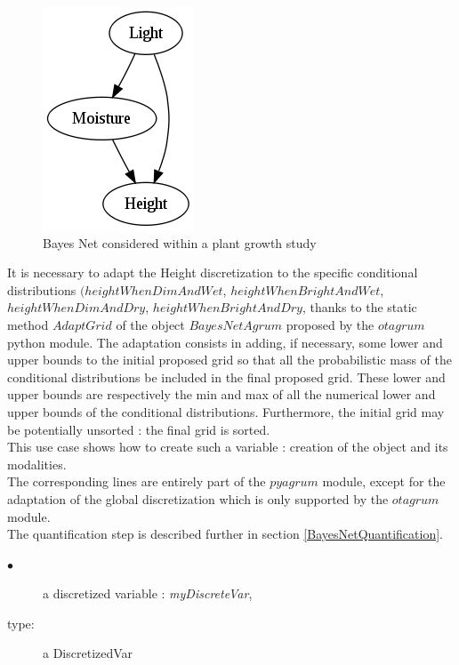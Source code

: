 \begin{figure}[H]
\begin{center}
    \includegraphics[scale=0.85]{PlantGrowth.png}
    \caption{Bayes Net considered within a plant growth study}
    \label{BNPlant}
  \end{center}
\end{figure}




It is necessary to adapt the Height discretization to the specific conditional distributions $(heightWhenDimAndWet$, $heightWhenBrightAndWet$, $heightWhenDimAndDry$, $heightWhenBrightAndDry$, thanks to the static method $AdaptGrid$ of the object $BayesNetAgrum$ proposed by the $otagrum$ python module.  The adaptation consists in adding, if necessary, some lower and upper bounds to the initial proposed grid so that all the probabilistic mass of  the conditional distributions be included in the final proposed grid. These lower and upper bounds are respectively the min and max of all the numerical lower and upper bounds of the conditional distributions. Furthermore, the initial grid may be potentially unsorted : the final grid is sorted.\\


This use case shows how to create such a variable : creation of the object and its modalities.\\

The corresponding lines are entirely part of the $pyagrum$ module, except for the adaptation of the global discretization which is only supported by the  $otagrum$ module.\\

 The quantification step is described further in section \ref{BayesNetQuantification}.\\

{
  \begin{description}
  \item[$\bullet$] a discretized variable  : {\itshape myDiscreteVar},
  \item[type:] a DiscretizedVar
  \end{description}
}



